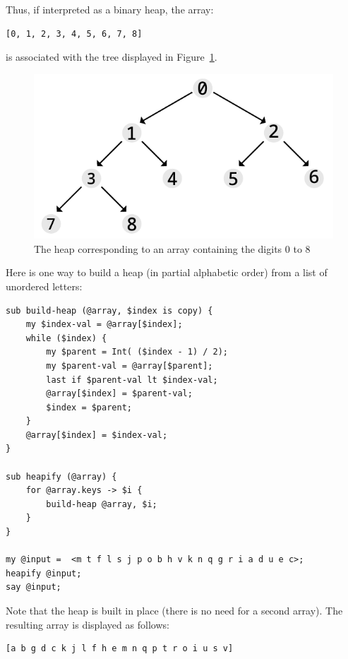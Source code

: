 Thus, if interpreted as a binary heap, the array:
\begin{verbatim}
[0, 1, 2, 3, 4, 5, 6, 7, 8]
\end{verbatim}

is associated with the tree displayed in Figure~\ref{fig.heap}.

\begin{figure}
\centerline
{\includegraphics[scale=1]{figs/figure_heap.pdf}}
\caption{The heap corresponding to an array containing the digits 0 to 8}
\label{fig.heap}
\end{figure}

Here is one way to build a heap (in partial alphabetic order) 
from a list of unordered letters:

\begin{verbatim}
sub build-heap (@array, $index is copy) {
    my $index-val = @array[$index];
    while ($index) {
        my $parent = Int( ($index - 1) / 2);
        my $parent-val = @array[$parent];
        last if $parent-val lt $index-val;
        @array[$index] = $parent-val;
        $index = $parent;
    }
    @array[$index] = $index-val;
}

sub heapify (@array) {
    for @array.keys -> $i {
        build-heap @array, $i;
    }
}

my @input =  <m t f l s j p o b h v k n q g r i a d u e c>; 
heapify @input;
say @input;
\end{verbatim}

Note that the heap is built in place (there is no 
need for a second array). The resulting array is 
displayed as follows:
\begin{verbatim}
[a b g d c k j l f h e m n q p t r o i u s v]
\end{verbatim}

